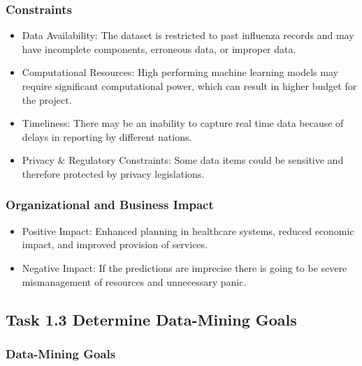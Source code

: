 \subsubsection*{Constraints}

\begin{itemize}
  \item Data Availability: The dataset is restricted to past influenza records and may have incomplete components, erroneous data, or improper data.
  \item Computational Resources: High performing machine learning models may require significant computational power, which can result in higher budget for the project.
  \item Timeliness: There may be an inability to capture real time data because of delays in reporting by different nations.
  \item Privacy \& Regulatory Constraints: Some data items could be sensitive and therefore protected by privacy legislations.
\end{itemize}

\subsubsection*{Organizational and Business Impact}

\begin{itemize}
  \item Positive Impact: Enhanced planning in healthcare systems, reduced economic impact, and improved provision of services.
  \item Negative Impact: If the predictions are imprecise there is going to be severe mismanagement of resources and unnecessary panic.
\end{itemize}

\subsection*{Task 1.3 Determine Data-Mining Goals}

\subsubsection*{Data-Mining Goals}

